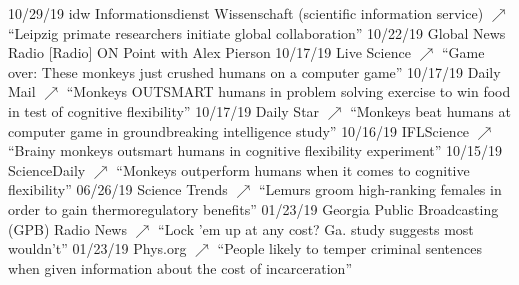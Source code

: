 \documentclass[]{friggeri-cv}
\begin{document}
\begin{entrylist}
  \entry
    {10/29/19}
    {idw Informationsdienst Wissenschaft (scientific information service) \href{https://idw-online.de/de/news726094}{\small $\nearrow$}}
    {}
    {``Leipzig primate researchers initiate global collaboration''}
  \entry
    {10/22/19}
    {Global News Radio}
    {}
    {{[}Radio{]} ON Point with Alex Pierson}
  \entry
    {10/17/19}
    {Live Science \href{https://www.livescience.com/monkeys-outsmart-humans.html}{\small $\nearrow$}}
    {}
    {``Game over: These monkeys just crushed humans on a computer game''}
  \entry
    {10/17/19}
    {Daily Mail \href{https://www.dailymail.co.uk/sciencetech/article-7585197/Monkeys-OUTSMART-humans-problem-solving-exercise-win-food-test-cognitive-flexibility.html}{\small $\nearrow$}}
    {}
    {``Monkeys OUTSMART humans in problem solving exercise to win food in test of cognitive flexibility''}
  \entry
    {10/17/19}
    {Daily Star \href{https://www.dailystar.co.uk/news/weird-news/monkeys-beat-humans-computer-game-20642153}{\small $\nearrow$}}
    {}
    {``Monkeys beat humans at computer game in groundbreaking intelligence study''}
  \entry
    {10/16/19}
    {IFLScience \href{https://www.iflscience.com/brain/brainy-monkeys-outsmart-humans-in-cognitive-flexibility-experiment/}{\small $\nearrow$}}
    {}
    {``Brainy monkeys outsmart humans in cognitive flexibility experiment''}
  \entry
    {10/15/19}
    {ScienceDaily \href{https://www.sciencedaily.com/releases/2019/10/191015115356.htm}{\small $\nearrow$}}
    {}
    {``Monkeys outperform humans when it comes to cognitive flexibility''}
  \entry
    {06/26/19}
    {Science Trends \href{https://sciencetrends.com/lemurs-groom-high-ranking-females-in-order-to-gain-thermoregulatory-benefits/}{\small $\nearrow$}}
    {}
    {``Lemurs groom high-ranking females in order to gain thermoregulatory benefits''}
  \entry
    {01/23/19}
    {Georgia Public Broadcasting (GPB) Radio News \href{https://phys.org/news/2019-01-people-temper-criminal-sentences-incarceration.html}{\small $\nearrow$}}
    {}
    {``Lock 'em up at any cost? Ga. study suggests most wouldn't''}
  \entry
    {01/23/19}
    {Phys.org \href{https://www.gpbnews.org/post/lock-em-any-cost-ga-study-suggests-most-wouldnt}{\small $\nearrow$}}
    {}
    {``People likely to temper criminal sentences when given information about the cost of incarceration''}
\end{entrylist}


\end{document}
